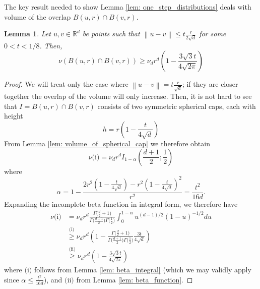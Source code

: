 \documentclass[11pt,twoside]{article}
\newtheorem{lemma}{Lemma}
\newcommand{\Reals}{\mathbb{R}}
\newcommand{\Rd}{\Reals^d}
\newcommand{\norm}[1]{\left\lVert#1\right\rVert}
\newcommand{\1}{\mathbf{1}}
\begin{document}
The key result needed to show Lemma \ref{lem: one_step_distributions} deals with volume of the overlap $B(u,r) \cap B(v,r)$. 

\begin{lemma}
	\label{lem: overlap_balls_1}
	Let $u,v \in \Rd$ be points such that $\norm{u - v} \leq t\frac{r}{2\sqrt{d}}$ for some $0 < t < 1/8$. Then,
	\begin{equation*}
	\nu(B(u,r) \cap B(v,r)) \geq \nu_d r^d \left(1 - \frac{3 \sqrt{3} t}{4\sqrt{2\pi}} \right)
	\end{equation*}
\end{lemma}
\begin{proof}
	We will treat only the case where $\norm{u - v} = t\frac{r}{\sqrt{d}}$; if they are closer together the overlap of the volume will only increase. Then, it is not hard to see that $I = B(u,r) \cap B(v,r)$ consists of two symmetric spherical caps, each with height
	\begin{equation*}
	h = r\left(1 - \frac{t}{4\sqrt{d}}\right)
	\end{equation*} 
	From Lemma \ref{lem: volume_of_spherical_cap} we therefore obtain
	\begin{equation*}
	\nu\text{(i)} = \nu_d r^d I_{1 - \alpha}(\frac{d + 1}{2}; \frac{1}{2})
	\end{equation*}
	where
	\begin{equation*}
	\alpha = 1 - \frac{2r^2(1 - \frac{t}{4 \sqrt{d}}) - r^2(1 - \frac{t}{4 \sqrt{d}})^2}{r^2} = \frac{t^2}{16d}.
	\end{equation*}
	Expanding the incomplete beta function in integral form, we therefore have
	\begin{align*}
	\nu\text{(i)} & = \nu_d r^d \frac{\Gamma\bigl(\frac{d}{2}+ 1\bigr)}{\Gamma\bigl(\frac{d + 1}{2}\bigr) \Gamma\bigl(\frac{1}{2}\bigr)} \int_{0}^{1 - \alpha}u^{(d-1)/2}(1 - u)^{-1/2}du \\
	& \overset{\text{(i)}}{\geq} \nu_d r^d \left(1 - \frac{\Gamma\bigl(\frac{d}{2}+ 1\bigr)}{\Gamma\bigl(\frac{d + 1}{2}\bigr) \Gamma\bigl(\frac{1}{2}\bigr)} \frac{3 t}{4\sqrt{d}} \right) \\
	& \overset{\text{(ii)}}{\geq} \nu_d r^d \left(1 -  \frac{3 \sqrt{3} t}{4\sqrt{2\pi}} \right)
	\end{align*}
	where $\text{(i)}$ follows from Lemma \ref{lem: beta_integral} (which we may validly apply since $\alpha \leq \frac{t^2}{16d}$), and $\text{(ii)}$ from Lemma \ref{lem: beta_function}.
\end{proof}
\end{document}
